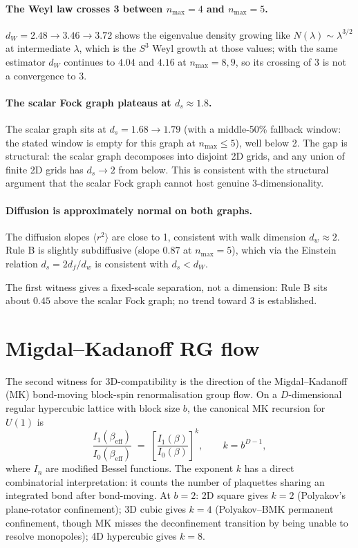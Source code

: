 \documentclass[11pt]{article}
\begin{document}
\paragraph{The Weyl law crosses 3 between $n_\text{max}=4$ and $n_\text{max}=5$.}
$d_W=2.48\to 3.46\to 3.72$ shows the eigenvalue density growing like
$N(\lambda)\sim\lambda^{3/2}$ at intermediate $\lambda$, which is the $S^3$ Weyl
growth at those values; with the same estimator $d_W$ continues to $4.04$
and $4.16$ at $n_\text{max} = 8, 9$, so its crossing of 3 is not a
convergence to 3.

\paragraph{The scalar Fock graph plateaus at $d_s\approx 1.8$.} The scalar graph
sits at $d_s=1.68\to 1.79$ (with a middle-50\% fallback window: the stated
window is empty for this graph at $n_\text{max} \le 5$), well below 2. The gap is structural: the scalar graph decomposes into
disjoint 2D grids, and any union of finite 2D grids has $d_s\to 2$ from below.
This is consistent with the structural argument that the scalar Fock graph
cannot host genuine 3-dimensionality.

\paragraph{Diffusion is approximately normal on both graphs.} The diffusion
slopes $\langle r^2\rangle$ are close to 1, consistent with walk dimension
$d_w\approx 2$. Rule B is slightly subdiffusive (slope $0.87$ at $n_\text{max}=5$),
which via the Einstein relation $d_s=2d_f/d_w$ is consistent with $d_s<d_W$.

The first witness gives a fixed-scale separation, not a dimension: Rule B
sits about $0.45$ above the scalar Fock graph; no trend toward 3 is
established.

\section{Migdal--Kadanoff RG flow}
\label{sec:mk_rg}

The second witness for 3D-compatibility is the direction of the
Migdal--Kadanoff (MK) bond-moving block-spin renormalisation group flow. On a
$D$-dimensional regular hypercubic lattice with block size $b$, the canonical
MK recursion for $U(1)$ is
\begin{equation}
\frac{I_1(\beta_\text{eff})}{I_0(\beta_\text{eff})}
\;=\;\left[\frac{I_1(\beta)}{I_0(\beta)}\right]^{k},
\qquad k=b^{D-1},
\end{equation}
where $I_n$ are modified Bessel functions. The exponent $k$ has a direct
combinatorial interpretation: it counts the number of plaquettes sharing an
integrated bond after bond-moving. At $b=2$: 2D square gives $k=2$ (Polyakov's
plane-rotator confinement); 3D cubic gives $k=4$ (Polyakov--BMK permanent
confinement, though MK misses the deconfinement transition by being unable to
resolve monopoles); 4D hypercubic gives $k=8$.
\end{document}
